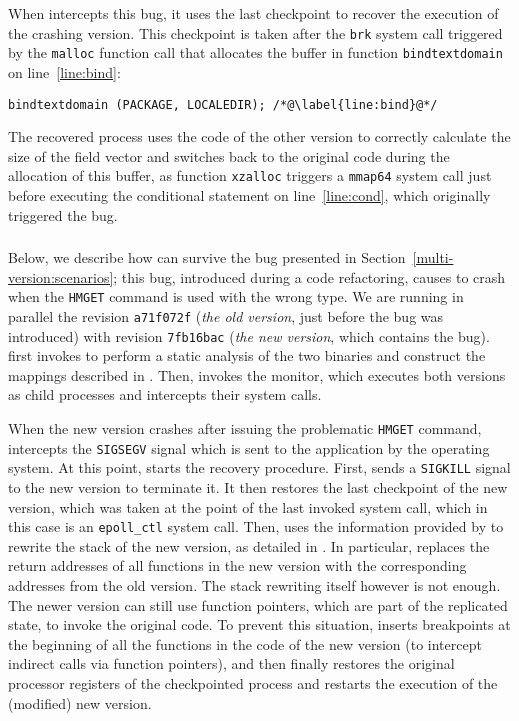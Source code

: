 When \mx intercepts this bug, it uses the last checkpoint to recover the
execution of the crashing version. This checkpoint is taken after the
\lstinline`brk` system call triggered by the \lstinline`malloc` function call
that allocates the buffer in function \lstinline`bindtextdomain` on
line~\ref{line:bind}:

\begin{lstlisting}[firstnumber=755]
bindtextdomain (PACKAGE, LOCALEDIR); /*@\label{line:bind}@*/
\end{lstlisting}

The recovered process uses the code of the other version to correctly
calculate the size of the field vector and switches back to the original
code during the allocation of this buffer, as
function \lstinline`xzalloc` triggers a \lstinline`mmap64` system call just
before executing the conditional statement on line~\ref{line:cond},
which originally triggered the bug.

\subsubsection{\redis}
\label{sec:redis}

Below, we describe how \mx can survive the \redis bug presented in
Section~\ref{multi-version:scenarios}; this bug, introduced during a code
refactoring, causes \redis to crash when the \lstinline`HMGET` command is used
with the wrong type. We are running in parallel the revision \texttt{a71f072f}
(\textit{the old version}, just before the bug was introduced) with revision
\texttt{7fb16bac} (\textit{the new version}, which contains the bug).  \mx
first invokes \sea to perform a static analysis of the two binaries and
construct the mappings described in .  Then, \mx invokes the \mxm
monitor, which executes both versions as child processes and intercepts their
system calls.

When the new version crashes after issuing the problematic
\lstinline`HMGET` command, \mxm intercepts the \lstinline`SIGSEGV` signal
which is sent to the application by the operating system.  At
this point, \rem starts the recovery procedure.  First, \rem sends a
\lstinline`SIGKILL` signal to the new version to terminate it.  It then
restores the last checkpoint of the new version, which was taken at the
point of the last invoked system call, which in this case is an
\lstinline`epoll_ctl` system call.  Then, \rem uses the information
provided by \sea to rewrite the stack of the new version, as detailed
in .  In particular, \rem replaces the return
addresses of all functions in the new version with the corresponding
addresses from the old version. The stack rewriting itself however is not
enough. The newer version can still use function pointers, which are
part of the replicated state, to invoke the original code. To prevent
this situation, \rem inserts breakpoints at the beginning of all the
functions in the code of the new version (to intercept indirect calls
via function pointers), and then finally restores the original processor
registers of the checkpointed process and restarts the execution of the
(modified) new version.

